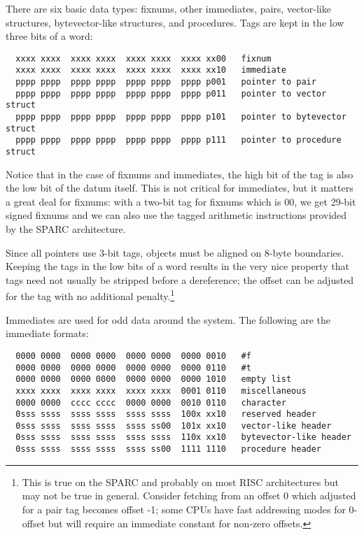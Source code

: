 There are six basic data types: fixnums, other immediates, pairs, vector-like
structures, bytevector-like structures, and procedures. Tags are kept in the
low three bits of a word:

\begin{minipage}{\linewidth}
\begin{verbatim}
  xxxx xxxx  xxxx xxxx  xxxx xxxx  xxxx xx00   fixnum
  xxxx xxxx  xxxx xxxx  xxxx xxxx  xxxx xx10   immediate
  pppp pppp  pppp pppp  pppp pppp  pppp p001   pointer to pair 
  pppp pppp  pppp pppp  pppp pppp  pppp p011   pointer to vector struct
  pppp pppp  pppp pppp  pppp pppp  pppp p101   pointer to bytevector struct
  pppp pppp  pppp pppp  pppp pppp  pppp p111   pointer to procedure struct
\end{verbatim}
\end{minipage}

Notice that in the case of fixnums and immediates, the high bit of the tag is
also the low bit of the datum itself. This is not critical for immediates,
but it matters a great deal for fixnums: with a two-bit tag for fixnums
which is 00, we get 29-bit signed fixnums and we can also use the tagged
arithmetic instructions provided by the SPARC architecture.

Since all pointers use 3-bit tags, objects must be aligned on 8-byte
boundaries. Keeping the tags in the low bits of a word results in the very
nice property that tags need not usually be stripped before a dereference;
the offset can be adjusted for the tag with no additional
penalty.\footnote{This is true on the SPARC and probably on most RISC
architectures but may not be true in general. Consider fetching from an
offset 0 which adjusted for a pair tag becomes offset -1; some CPUs have
fast addressing modes for 0-offset but will require an immediate constant
for non-zero offsets.}

Immediates are used for odd data around the system. The following are
the immediate formats:

\begin{minipage}{\linewidth}
\begin{verbatim}
  0000 0000  0000 0000  0000 0000  0000 0010   #f
  0000 0000  0000 0000  0000 0000  0000 0110   #t
  0000 0000  0000 0000  0000 0000  0000 1010   empty list
  xxxx xxxx  xxxx xxxx  xxxx xxxx  0001 0110   miscellaneous
  0000 0000  cccc cccc  0000 0000  0010 0110   character
  0sss ssss  ssss ssss  ssss ssss  100x xx10   reserved header
  0sss ssss  ssss ssss  ssss ss00  101x xx10   vector-like header
  0sss ssss  ssss ssss  ssss ssss  110x xx10   bytevector-like header
  0sss ssss  ssss ssss  ssss ss00  1111 1110   procedure header
\end{verbatim}
\end{minipage}

